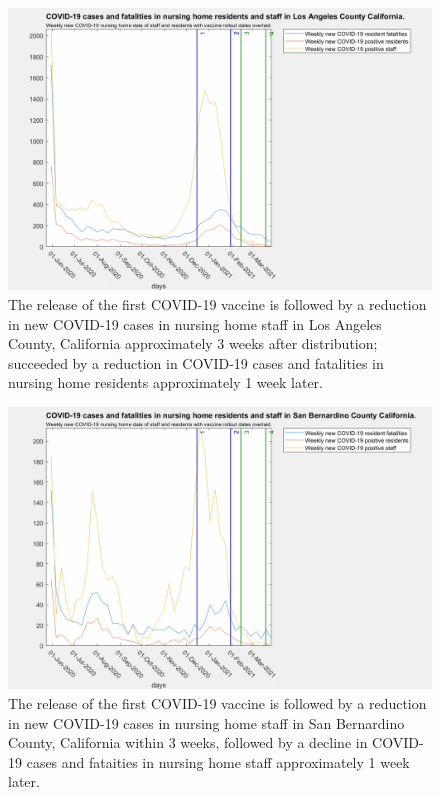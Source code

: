 \documentclass[twoside]{article}
\begin{document}
\begin{multicols}{2}
\begin{figure}[H]
	\includegraphics[width=\linewidth]{images/losangeles_nursing_home_with_vaccine.png}
	\caption{The release of the first COVID-19 vaccine is followed by a reduction in new COVID-19 cases in nursing home staff in Los Angeles County, California approximately 3 weeks after distribution; succeeded by a reduction in COVID-19 cases and fatalities in nursing home residents approximately 1 week later. }
	\label{fig:images/losangeles_nursing_home_with_vaccineLabel}
\end{figure}

\begin{figure}[H]
	\includegraphics[width=\linewidth]{images/sanbernardino_nursing_home_with_vaccine.png}
	\caption{The release of the first COVID-19 vaccine is followed by a reduction in new COVID-19 cases in nursing home staff in San Bernardino County, California within 3 weeks, followed by a decline in COVID-19 cases and fataities in nursing home staff approximately 1 week later. }
	\label{fig:images/sanbernardino_nursing_home_with_vaccineLabel}
\end{figure}


\end{multicols}
\end{document}
